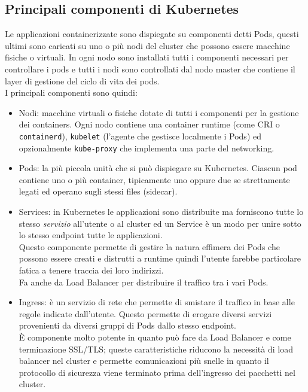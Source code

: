 \documentclass[12pt,a4paper,openright,twoside]{book}
\begin{document}
\subsection{Principali componenti di Kubernetes}
Le applicazioni containerizzate sono dispiegate su componenti detti Pods, questi ultimi sono caricati su uno o più nodi del cluster che possono essere macchine fisiche o virtuali. In ogni nodo sono installati tutti i componenti necessari per controllare i pods e tutti i nodi sono controllati dal nodo master che contiene il layer di gestione del ciclo di vita dei pods.\\
I principali componenti sono quindi:
\begin{itemize}
    \item {
        Nodi: macchine virtuali o fisiche dotate di tutti i componenti per la gestione dei containers. Ogni nodo contiene una container runtime (come CRI o \texttt{containerd}), \texttt{kubelet} (l'agente che gestisce localmente i Pods) ed opzionalmente \texttt{kube-proxy} che implementa una parte del networking.
    }
    \item {
        Pods: la più piccola unità che si può dispiegare su Kubernetes. Ciascun pod contiene uno o più container, tipicamente uno oppure due se strettamente legati ed operano sugli stessi files (sidecar).
    }
    \item {
        Services: in Kubernetes le applicazioni sono distribuite ma forniscono tutte lo stesso \textit{servizio} all'utente o al cluster ed un Service è un modo per unire sotto lo stesso endpoint tutte le applicazioni.\\
        Questo componente permette di gestire la natura effimera dei Pods che possono essere creati e distrutti a runtime quindi l'utente farebbe particolare fatica a tenere traccia dei loro indirizzi.\\
        Fa anche da Load Balancer per distribuire il traffico tra i vari Pods.
    }
    \item {
        Ingress: è un servizio di rete che permette di smistare il traffico in base alle regole indicate dall'utente. Questo permette di erogare diversi servizi provenienti da diversi gruppi di Pods dallo stesso endpoint.\\
        È componente molto potente in quanto può fare da Load Balancer e come terminazione SSL/TLS; queste caratteristiche riducono la necessità di load balancer nel cluster e permette comunicazioni più snelle in quanto il protocollo di sicurezza viene terminato prima dell'ingresso dei pacchetti nel cluster.\\
}
\end{itemize}
\end{document}
